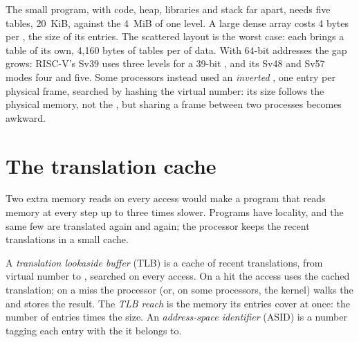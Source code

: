 The small program, with code, heap, libraries and stack far apart, needs five tables, 20~KiB, against the 4~MiB of one level. A large dense array costs 4 bytes per , the size of its entries. The scattered layout is the worst case: each  brings a table of its own, 4,160 bytes of tables per  of data. With 64-bit addresses the gap grows: RISC-V's Sv39 uses three levels for a 39-bit , %
and its Sv48 and Sv57 modes four and five. %
 Some processors instead used an \emph{inverted} , one entry per physical frame, searched by hashing the virtual  number: its size follows the physical memory, not the , but sharing a frame between two processes becomes awkward.

\section{The translation cache}\label{sec:b3:virtual-memory:tlb}

Two extra memory reads on every access would make a program that reads memory at every step up to three times slower. Programs have locality, and the same few  are translated again and again; the processor keeps the recent translations in a small cache.

\begin{definition}\label{def:b3:virtual-memory:tlb}
A \emph{translation lookaside buffer} (TLB) is a cache of recent translations, from virtual  number to , searched on every access. On a hit the access uses the cached translation; on a miss the processor (or, on some processors, the kernel) walks the  and stores the result. The \emph{TLB reach} is the memory its entries cover at once: the number of entries times the  size. An \emph{address-space identifier} (ASID) is a number tagging each entry with the  it belongs to.
\end{definition}

